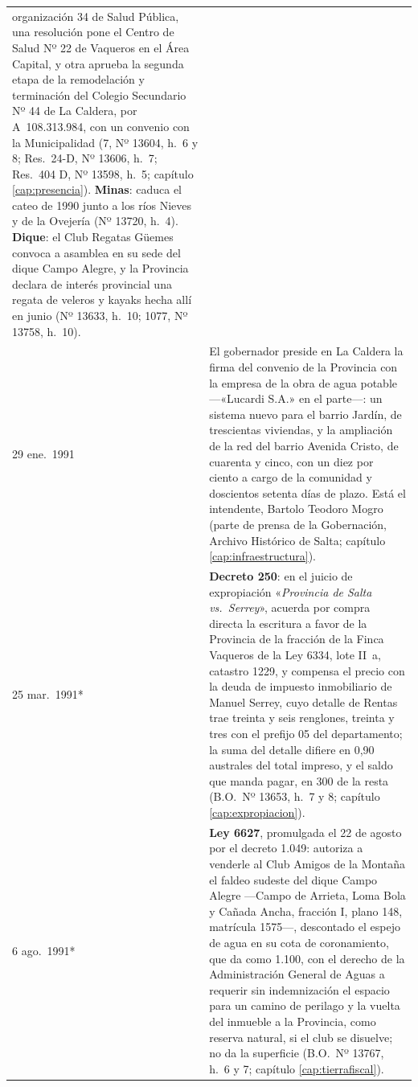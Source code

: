 \begin{longtable}{@{}p{2.7cm}p{10.3cm}@{}}
organización 34 de Salud Pública, una resolución pone el Centro de Salud Nº 22 de Vaqueros en el Área Capital, y otra aprueba la segunda etapa de la remodelación y terminación del Colegio Secundario Nº 44 de La Caldera, por A~108.313.984, con un convenio con la Municipalidad (7, Nº 13604, h.\ 6 y 8; Res.\ 24-D, Nº 13606, h.\ 7; Res.\ 404 D, Nº 13598, h.\ 5; capítulo \ref{cap:presencia}). \textbf{Minas}: caduca el cateo de 1990 junto a los ríos Nieves y de la Ovejería (Nº 13720, h.\ 4). \textbf{Dique}: el Club Regatas Güemes convoca a asamblea en su sede del dique Campo Alegre, y la Provincia declara de interés provincial una regata de veleros y kayaks hecha allí en junio (Nº 13633, h.\ 10; 1077, Nº 13758, h.\ 10). \\
29 ene.\ 1991 & El gobernador preside en La Caldera la firma del convenio de la Provincia con la empresa de la obra de agua potable ---«Lucardi S.A.» en el parte---: un sistema nuevo para el barrio Jardín, de trescientas viviendas, y la ampliación de la red del barrio Avenida Cristo, de cuarenta y cinco, con un diez por ciento a cargo de la comunidad y doscientos setenta días de plazo. Está el intendente, Bartolo Teodoro Mogro (parte de prensa de la Gobernación, Archivo Histórico de Salta; capítulo \ref{cap:infraestructura}). \\
25 mar.\ 1991* & \textbf{Decreto 250}: en el juicio de expropiación «\textit{Provincia de Salta vs.\ Serrey}», acuerda por compra directa la escritura a favor de la Provincia de la fracción de la Finca Vaqueros de la Ley 6334, lote II~a, catastro 1229, y compensa el precio con la deuda de impuesto inmobiliario de Manuel Serrey, cuyo detalle de Rentas trae treinta y seis renglones, treinta y tres con el prefijo 05 del departamento; la suma del detalle difiere en 0,90 australes del total impreso, y el saldo que manda pagar, en 300 de la resta (B.O.\ Nº 13653, h.\ 7 y 8; capítulo \ref{cap:expropiacion}). \\
6 ago.\ 1991* & \textbf{Ley 6627}, promulgada el 22 de agosto por el decreto 1.049: autoriza a venderle al Club Amigos de la Montaña el faldeo sudeste del dique Campo Alegre ---Campo de Arrieta, Loma Bola y Cañada Ancha, fracción I, plano 148, matrícula 1575---, descontado el espejo de agua en su cota de coronamiento, que da como 1.100, con el derecho de la Administración General de Aguas a requerir sin indemnización el espacio para un camino de perilago y la vuelta del inmueble a la Provincia, como reserva natural, si el club se disuelve; no da la superficie (B.O.\ Nº 13767, h.\ 6 y 7; capítulo \ref{cap:tierrafiscal}). \\

\end{longtable}
